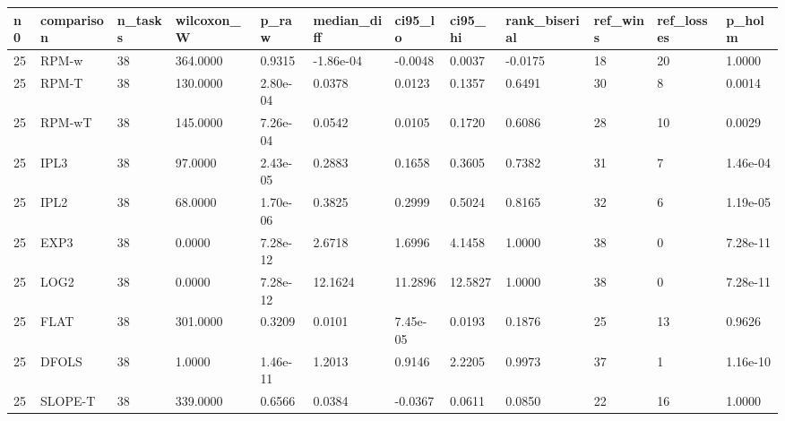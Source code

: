 \begin{tabular}{llllllllllll}
\hline
n0 & comparison & n\_tasks & wilcoxon\_W & p\_raw & median\_diff & ci95\_lo & ci95\_hi & rank\_biserial & ref\_wins & ref\_losses & p\_holm \\
\hline
25 & RPM-w & 38 & 364.0000 & 0.9315 & -1.86e-04 & -0.0048 & 0.0037 & -0.0175 & 18 & 20 & 1.0000 \\
25 & RPM-T & 38 & 130.0000 & 2.80e-04 & 0.0378 & 0.0123 & 0.1357 & 0.6491 & 30 & 8 & 0.0014 \\
25 & RPM-wT & 38 & 145.0000 & 7.26e-04 & 0.0542 & 0.0105 & 0.1720 & 0.6086 & 28 & 10 & 0.0029 \\
25 & IPL3 & 38 & 97.0000 & 2.43e-05 & 0.2883 & 0.1658 & 0.3605 & 0.7382 & 31 & 7 & 1.46e-04 \\
25 & IPL2 & 38 & 68.0000 & 1.70e-06 & 0.3825 & 0.2999 & 0.5024 & 0.8165 & 32 & 6 & 1.19e-05 \\
25 & EXP3 & 38 & 0.0000 & 7.28e-12 & 2.6718 & 1.6996 & 4.1458 & 1.0000 & 38 & 0 & 7.28e-11 \\
25 & LOG2 & 38 & 0.0000 & 7.28e-12 & 12.1624 & 11.2896 & 12.5827 & 1.0000 & 38 & 0 & 7.28e-11 \\
25 & FLAT & 38 & 301.0000 & 0.3209 & 0.0101 & 7.45e-05 & 0.0193 & 0.1876 & 25 & 13 & 0.9626 \\
25 & DFOLS & 38 & 1.0000 & 1.46e-11 & 1.2013 & 0.9146 & 2.2205 & 0.9973 & 37 & 1 & 1.16e-10 \\
25 & SLOPE-T & 38 & 339.0000 & 0.6566 & 0.0384 & -0.0367 & 0.0611 & 0.0850 & 22 & 16 & 1.0000 \\
\hline
\end{tabular}
